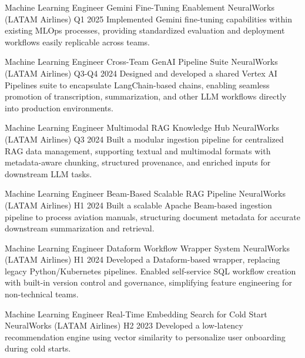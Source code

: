 \begin{cventries}

  \cventry
  {Machine Learning Engineer}
  {Gemini Fine-Tuning Enablement}
  {NeuralWorks (LATAM Airlines)}
  {Q1 2025}
  {Implemented Gemini fine-tuning capabilities within existing MLOps processes, providing standardized evaluation and deployment workflows easily replicable across teams.}

  \cventry
  {Machine Learning Engineer}
  {Cross-Team GenAI Pipeline Suite}
  {NeuralWorks (LATAM Airlines)}
  {Q3-Q4 2024}
  {Designed and developed a shared Vertex AI Pipelines suite to encapsulate LangChain-based chains, enabling seamless promotion of transcription, summarization, and other LLM workflows directly into production environments.}

  \cventry
  {Machine Learning Engineer}
  {Multimodal RAG Knowledge Hub}
  {NeuralWorks (LATAM Airlines)}
  {Q3 2024}
  {Built a modular ingestion pipeline for centralized RAG data management, supporting textual and multimodal formats with metadata-aware chunking, structured provenance, and enriched inputs for downstream LLM tasks.}

  \cventry
  {Machine Learning Engineer}
  {Beam-Based Scalable RAG Pipeline}
  {NeuralWorks (LATAM Airlines)}
  {H1 2024}
  {Built a scalable Apache Beam-based ingestion pipeline to process aviation manuals, structuring document metadata for accurate downstream summarization and retrieval.}

  \cventry
  {Machine Learning Engineer}
  {Dataform Workflow Wrapper System}
  {NeuralWorks (LATAM Airlines)}
  {H1 2024}
  {Developed a Dataform-based wrapper, replacing legacy Python/Kubernetes pipelines. Enabled self-service SQL workflow creation with built-in version control and governance, simplifying feature engineering for non-technical teams.}

  \cventry
  {Machine Learning Engineer}
  {Real-Time Embedding Search for Cold Start}
  {NeuralWorks (LATAM Airlines)}
  {H2 2023}
  {Developed a low-latency recommendation engine using vector similarity to personalize user onboarding during cold starts.}

\end{cventries}
